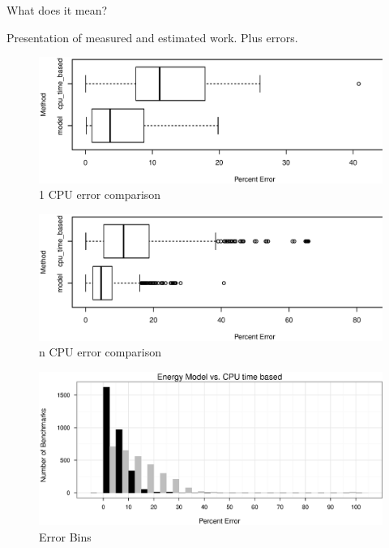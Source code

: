 \label{sec:evaluation}

What does it mean?


\label{sec:error}

Presentation of measured and estimated work. Plus errors.


\label{sec:time-based}

\begin{figure}
  \centering
    \includegraphics[width=\textwidth]{fig/1cpu-bench-errs.eps}
  \caption{1 CPU error comparison}
  \label{fig:errs-1cpu}
\end{figure}

\begin{figure}
  \centering
    \includegraphics[width=\textwidth]{fig/Ncpu-bench-errs.eps}
  \caption{n CPU error comparison}
  \label{fig:errs-ncpu}
\end{figure}

\begin{figure}
  \centering
    \includegraphics[width=\textwidth]{fig/hist-models.eps}
  \caption{Error Bins}
  \label{fig:errs-ncpu}
\end{figure}


